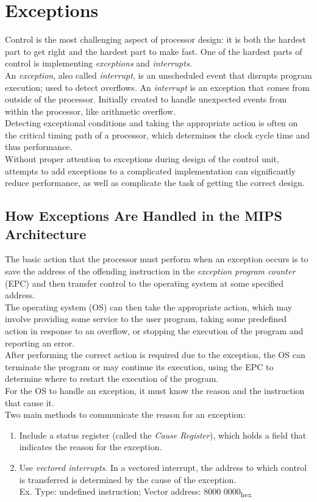 \documentclass[12pt]{article}
\theoremstyle{definition}
\begin{document}
  \newpage
  \section{Exceptions}
  Control is the most challenging aspect of processor design: it is both the hardest part to get right and the hardest part to make fast.
  One of the hardest parts of control is implementing \emph{exceptions} and \emph{interrupts}. \\
  An \emph{exception}, also called \emph{interrupt}, is an unscheduled event that disrupts program execution; used to detect overflows.
  An \emph{interrupt} is an exception that comes from outside of the processor.
  Initially created to handle unexpected events from within the processor, like arithmetic overflow. \\

  Detecting exceptional conditions and taking the appropriate action is often on the critical timing path of a processor, which determines the clock cycle time and thus performance. \\
  Without proper attention to exceptions during design of the control unit, attempts to add exceptions to a complicated implementation can significantly reduce performance, as well as complicate the task of getting the correct design.

  \subsection{How Exceptions Are Handled in the MIPS Architecture}
  The basic action that the processor must perform when an exception occurs is to save the address of the offending instruction in the \emph{exception program counter} (EPC) and then transfer control to the operating system at some specified address. \\

  The operating system (OS) can then take the appropriate action, which may involve providing some service to the user program, taking some predefined action in response to an overflow, or stopping the execution of the program and reporting an error. \\
  After performing the correct action is required due to the exception, the OS can terminate the program or may continue its execution, using the EPC to determine where to restart the execution of the program. \\

  For the OS to handle an exception, it must know the reason and the instruction that cause it. \\
  Two main methods to communicate the reason for an exception:
  \begin{enumerate}
    \item Include a status register (called the \emph{Cause Register}), which holds a field that indicates the reason for the exception.
    \item Use \emph{vectored interrupts}. In a vectored interrupt, the address to which control is transferred is determined by the cause of the exception. \\
    Ex. Type: undefined instruction; Vector address: 8000 0000\textsubscript{hex}
  \end{enumerate}
\end{document}
